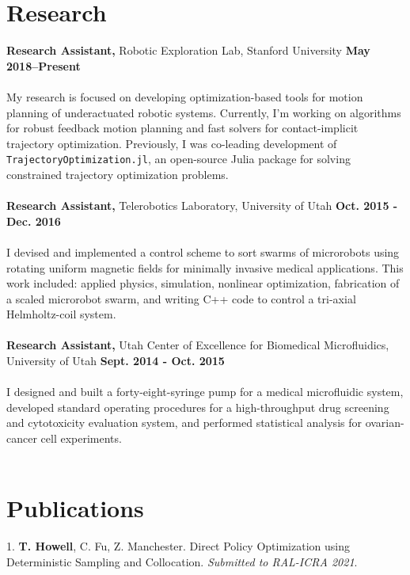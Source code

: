 \documentclass[margin,line]{res}
\begin{document}
\begin{resume}
\section{\sc Research}
{\bf Research Assistant,} Robotic Exploration Lab, Stanford University
\hfill {\bf May 2018--Present}\\
\\
My research is focused on developing optimization-based tools for motion planning of underactuated robotic systems. Currently, I'm working on algorithms for robust feedback motion planning and fast solvers for contact-implicit trajectory optimization. Previously, I was co-leading development of \texttt{TrajectoryOptimization.jl}, an open-source Julia package for solving constrained trajectory optimization problems. \\
\\
{\bf Research Assistant,} Telerobotics Laboratory, University of Utah
\hfill {\bf Oct. 2015 - Dec. 2016}\\
\\
I devised and implemented a control scheme to sort swarms of microrobots using rotating uniform
magnetic fields for minimally invasive medical applications. This work included: applied physics, simulation, nonlinear optimization, fabrication of a scaled microrobot swarm, and writing C++ code to control a tri-axial Helmholtz-coil system.\\
\\
{\bf Research Assistant,} Utah Center of Excellence for Biomedical Microfluidics, University of Utah
\hfill {\bf Sept. 2014 - Oct. 2015}\\
\\
I designed and built a forty-eight-syringe pump for a medical microfluidic system, developed standard operating procedures for a high-throughput drug screening and cytotoxicity evaluation system, and performed statistical analysis for ovarian-cancer cell experiments.\\
\\
\section{\sc Publications}
1. \textbf{T. Howell}, C. Fu, Z. Manchester. Direct Policy Optimization using Deterministic Sampling and Collocation. \textit{Submitted to RAL-ICRA 2021}.\\


\end{resume}
\end{document}
